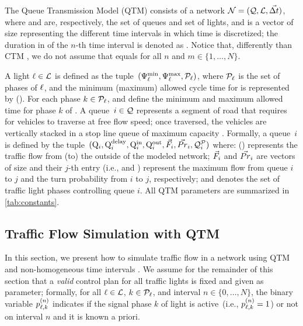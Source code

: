 The Queue Transmission Model (QTM) consists of a network $\mathcal{N} = (\mathcal{Q}, \mathcal{L},
\vec{\Delta t})$, where \Qset and \Lset are, respectively, the set of queues and set of
lights, and \vecDT is a vector of size \Nn representing the different time
intervals in which time is discretized;
%
the duration in  of the $n$-th time interval is denoted as
\DT[n].
%
Notice that, differently than CTM \cite{daganzo1994cell,lin2004enhanced}, we do
not assume that \DT[n] equals \DT[m] for all $n$ and $m \in \{1,\dots,N\}$.


A light $\ell \in \mathcal{L}$ is defined as the tuple~$(\mathrm{\Psi}_{\ell}^{\mathrm{min}}, \mathrm{\Psi}_{\ell}^{\mathrm{max}},
\mathcal{P}_\ell)$, where $\mathcal{P}_\ell$ is the set of phases of $\ell$, and the minimum
(maximum) allowed cycle time for \tl is represented by \CTMIN{\tl}
(\CTMAX{\tl}).
%
For each phase $k \in \mathcal{P}_\ell$,  and  define the
minimum and maximum allowed time for phase $k$ of \tl.
%
A queue~$i \in \mathcal{Q}$ represents a segment of road that requires 
 for vehicles to traverse at free flow speed; once traversed, the
vehicles are vertically stacked in a stop line queue of maximum capacity
.
%
Formally, a queue~$i$ is defined by the tuple~$(\mathrm{Q}_{i}, \mathrm{Q}_{i}^{\mathrm{delay}}, \mathrm{Q}_{i}^{\mathrm{in}},
\mathrm{Q}_{i}^{\mathrm{out}}, \vec{F}_i, \vec{Pr}_i, \mathcal{Q}_{i}^{\mathcal{P}})$ where:
%
 () represents the traffic flow from (to) the outside of the
modeled network;
%
$\vec{F}_i$ and $\vec{Pr}_i$ are vectors of size \Qn and their $j$-th entry (i.e.,
 and ) represent the maximum flow from queue $i$ to $j$
and the turn probability from $i$ to $j$, respectively;
%
and  denotes the set of traffic light phases controlling queue $i$.
%
All QTM parameters are summarized in \cref{tab:constants}.




\subsection{Traffic Flow Simulation with QTM}

In this section, we present how to simulate traffic flow in a network using QTM
and non-homogeneous time intervals \DT[].
%
We assume for the remainder of this section that a \emph{valid} control plan for
all traffic lights is fixed and given as parameter;
%
formally, for all $\ell \in \mathcal{L}$, $k \in \mathcal{P}_\ell$, and interval $n \in
\{0,\dots,N\}$, the binary variable $p_{\ell,k}^{(n)}$ indicates if the signal phase
$k$ of light \tl is active~(i.e., $p_{\ell,k}^{(n)} = 1$) or not on interval $n$ and
it is known a priori.

